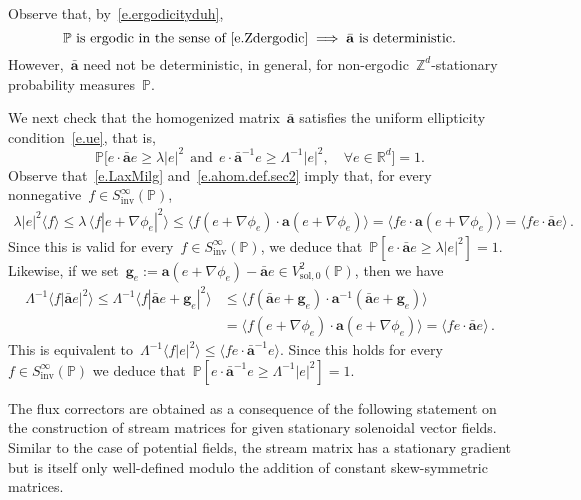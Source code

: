 \documentclass[11pt,twoside]{article} %
\numberwithin{equation}{section}
\theoremstyle{definition}
\newcommand*{\Zd}{\ensuremath{\mathbb{Z}^d}}
\newcommand*{\Rd}{\ensuremath{\mathbb{R}^d}}
\newcommand{\g}{\mathbf{g}}
\newcommand{\sol}{\mathrm{sol}}
\renewcommand{\a}{\mathbf{a}}
\newcommand{\ahom}{\bar{\a}}
\renewcommand{\P}{\mathbb{P}}
\begin{document}
Observe that, by~\eqref{e.ergodicityduh}, 
\begin{equation}
\mbox{$\P$ is ergodic in the sense of~\eqref{e.Zdergodic}}
\implies
\mbox{$\ahom$ is deterministic.}
\end{equation}
However,~$\ahom$ need not be deterministic, in general, for non-ergodic~$\Zd$-stationary probability measures~$\P$. 

\smallskip

We next check that the homogenized matrix~$\ahom$ satisfies the uniform ellipticity condition~\eqref{e.ue}, that is, 
\begin{equation}
\label{e.ahom.boundsme}
\P \bigl[  
e\cdot \ahom e \geq \lambda |e|^2
\ \ \mbox{and} \ \
e\cdot \ahom^{-1} e 
\geq 
\Lambda^{-1} |e|^2,
\quad \forall e\in\Rd
\bigr]
= 1.
\end{equation}
Observe that~\eqref{e.LaxMilg} and~\eqref{e.ahom.def.sec2} imply that, for every nonnegative~$f \in S^\infty_{\mathrm{inv}}(\P)$, 
\begin{align*}
\lambda |e|^2 \bigl\langle f \bigr\rangle
\leq 
\lambda \,\bigl\langle f |e+\nabla\phi_e|^2\bigr\rangle 
\leq
\bigl\langle f (e+\nabla\phi_e) \cdot \a (e+\nabla \phi_e) \bigr\rangle
=
\bigl\langle f e \cdot \a (e+\nabla \phi_e) \bigr\rangle
=
\bigl\langle f e \cdot \ahom e \bigr\rangle\,.
\end{align*}
Since this is valid for every~$f \in S^\infty_{\mathrm{inv}}(\P)$, we deduce that~$\P [e\cdot \ahom e \geq \lambda |e|^2] = 1$. 
Likewise, if we set~$\g_e := \a(e+\nabla\phi_e) - \ahom e \in V^2_{\sol,0}(\P)$, then we have 
\begin{align*}
\Lambda^{-1} \bigl \langle f | \ahom e|^2 \bigr\rangle
\leq 
\Lambda^{-1} 
\bigl \langle f | \ahom e + \g_e |^2 \bigr\rangle
&
\leq 
\bigl \langle f ( \ahom e + \g_e ) \cdot \a^{-1} ( \ahom e + \g_e ) \bigr\rangle
\\ & 
=
\bigl \langle f ( e+\nabla \phi_e ) \cdot \a ( e + \nabla \phi_e ) \bigr\rangle
= \bigl\langle f e \cdot \ahom e \bigr\rangle\,.
\end{align*}
This is equivalent to~$\Lambda^{-1} \bigl \langle f | e|^2 \bigr\rangle \leq \bigl\langle f e \cdot \ahom^{-1} e \bigr\rangle$.
Since this holds for every~$f \in S^\infty_{\mathrm{inv}}(\P)$ we deduce that~$\P [ e\cdot \ahom^{-1} e 
\geq 
\Lambda^{-1} |e|^2 ] = 1$. 
 
\smallskip 
 
The flux correctors are obtained as a consequence of the following statement on the construction of stream matrices for given stationary solenoidal vector fields. Similar to the case of potential fields, the stream matrix has a stationary gradient but is itself only well-defined modulo the addition of constant skew-symmetric matrices. 
\end{document}
